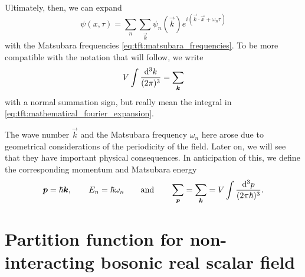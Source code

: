 Ultimately, then, we can expand
\begin{equation}
	\psi(x, \tau) = \sum_n \sum_\vec{k} \psi_n(\vec{k}) e^{i (\vec{k} \cdot \vec{x} + \omega_n \tau)}
\label{eq:tft:fourier_series}
\end{equation}
with the Matsubara frequencies \eqref{eq:tft:matsubara_frequencies}.
To be more compatible with the notation that will follow, we write
\begin{equation}
	V \int \frac{\mathop{}\!\mathrm{d}^3 k}{(2 \pi)^3} = \sum_{\bm{k}}
\label{eq:tft:continuous_limit}
\end{equation}
with a normal summation sign, but really mean the integral in \eqref{eq:tft:mathematical_fourier_expansion}.

The wave number $\vec{k}$ and the Matsubara frequency $\omega_n$ here arose due to geometrical considerations of the periodicity of the field.
Later on, we will see that they have important physical consequences.
In anticipation of this, we define the corresponding momentum and Matsubara energy
\begin{equation}
	{\bm{p}} = \hbar {\bm{k}}, \qquad
	E_n = \hbar \omega_n \qquad \text{and} \qquad
	\sum_{\bm{p}} = \sum_{\bm{k}} = V \int \frac{\mathop{}\!\mathrm{d}^3 p}{(2 \pi \hbar)^3}.
\label{eq:tft:matsubara_energies}
\end{equation}

\section{Partition function for non-interacting bosonic real scalar field}


